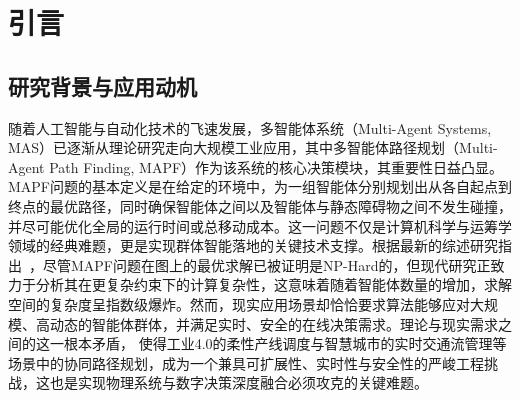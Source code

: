 \documentclass[13.5pt]{extarticle}
\begin{document}
\clearpage
{}

\begin{abstract}
随着工业 4.0 与智慧物流的快速发展，大规模多智能体系统（MAS）的协同作业已成为提升生产效率的关键。多智能体路径规划（MAPF）作为 MAS 的核心决策模块，面临着从静态封闭环境向动态开放环境迁移的巨大挑战。传统基于搜索与规则的算法在处理高维状态空间、复杂动态交互及非确定性干扰时，往往遭遇维数灾难与实时性瓶颈。深度强化学习（DRL）凭借其强大的端到端感知与自适应决策能力，为解决大规模协同规划难题提供了全新的范式。

本报告系统综述了基于强化学习的多智能体协同路径规划算法及其应用研究。首先，报告回顾了传统 MAPF 方法并指出了其在可扩展性与鲁棒性上的局限，进而建立了基于 Dec-POMDP 的多智能体决策数学模型。其次，深入剖析了“集中训练-分散执行”（CTDE）架构下的主流算法范式：重点阐述了以 VDN、QMIX 为代表的值分解方法在解决离散空间信贷分配与死锁问题上的机制，以及以 MADDPG、MAPPO 为代表的策略梯度方法在连续空间动力学控制中的演进。此外，报告探讨了融合传统规划先验知识与强化学习探索能力的混合式架构（Hybrid Planning-Learning），以及基于图神经网络（GNN）的时空交互拓扑建模技术。最后，报告总结了当前算法在从仿真迁移至真实物理环境、安全性保障及大规模异构集群调度方面面临的挑战，并展望了其在无人驾驶商用车队及智能仓储系统中的应用前景。
\end{abstract}
\clearpage


\tableofcontents

\clearpage
\section{引言}

\subsection{研究背景与应用动机}

随着人工智能与自动化技术的飞速发展，多智能体系统（Multi-Agent Systems, MAS）已逐渐从理论研究走向大规模工业应用，其中多智能体路径规划（Multi-Agent Path Finding, MAPF）作为该系统的核心决策模块，其重要性日益凸显。MAPF问题的基本定义是在给定的环境中，为一组智能体分别规划出从各自起点到终点的最优路径，同时确保智能体之间以及智能体与静态障碍物之间不发生碰撞，并尽可能优化全局的运行时间或总移动成本。这一问题不仅是计算机科学与运筹学领域的经典难题，更是实现群体智能落地的关键技术支撑。根据最新的综述研究指出~\cite{alkazzi2024comprehensive}，尽管MAPF问题在图上的最优求解已被证明是NP-Hard的，但现代研究正致力于分析其在更复杂约束下的计算复杂性，这意味着随着智能体数量的增加，求解空间的复杂度呈指数级爆炸。然而，现实应用场景却恰恰要求算法能够应对大规模、高动态的智能体群体，并满足实时、安全的在线决策需求。理论与现实需求之间的这一根本矛盾， 使得工业4.0的柔性产线调度与智慧城市的实时交通流管理等场景中的协同路径规划，成为一个兼具可扩展性、实时性与安全性的严峻工程挑战，这也是实现物理系统与数字决策深度融合必须攻克的关键难题。
\end{document}
